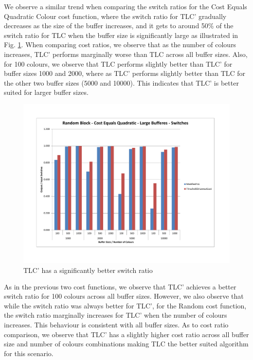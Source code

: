 We observe a similar trend when comparing the switch ratios for the Cost Equals Quadratic Colour cost function, where the switch ratio for TLC' gradually decreases as the size of the buffer increases, and it gets to around 50\% of the switch ratio for TLC when the buffer size is significantly large as illustrated in Fig. \ref{randomBlockCQLargeSwitches}. When comparing cost ratios, we observe that as the number of colours increases, TLC' performs marginally worse than TLC across all buffer sizes. Also, for 100 colours, we observe that TLC performs slightly better than TLC' for buffer sizes 1000 and 2000, where as TLC' performs slightly better than TLC for the other two buffer sizes (5000 and 10000). This indicates that TLC' is better suited for larger buffer sizes.

\begin{figure}[ht]
\centering 
\includegraphics[scale=0.60]{Random-Block-cq-large-switches.pdf}
\caption{TLC' has a significantly better switch ratio}
\label{randomBlockCQLargeSwitches}
\end{figure}   

As in the previous two cost functions, we observe that TLC' achieves a better switch ratio for 100 colours across all buffer sizes. However, we also observe that while the switch ratio was always better for TLC', for the Random cost function, the switch ratio marginally increases for TLC' when the number of colours increases. This behaviour is consistent with all buffer sizes. As to cost ratio comparison, we observe that TLC' has a slightly higher cost ratio across all buffer size and number of colours combinations making TLC the better suited algorithm for this scenario. 

